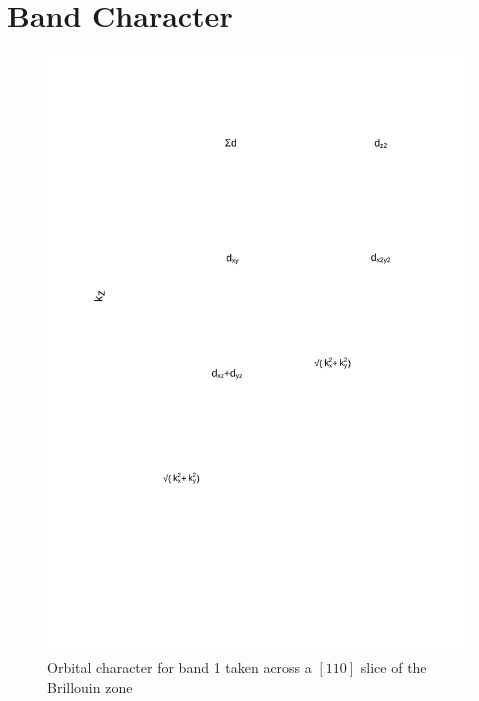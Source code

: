 
\chapter{\BaFeP Band Character}

\begin{figure}[h!]
    \begin{center}
        \includegraphics[scale=0.7]{Chapter3-dHvABaFe2P2/Figures/AngleDepMeasurements/BandCharacterPlot/Band1_110Slice_BandCharacter}
        \caption{Orbital character for band 1 taken across a $[110]$ slice of the Brillouin zone}
        \label{Fig:Appendix:BandCharacter110Band1}
    \end{center}
\end{figure}
